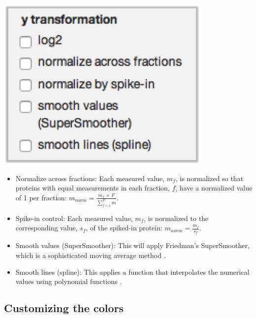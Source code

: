 \documentclass[letterpaper, twocolumn, 9pt]{article}
\begin{document}
\begin{center}
\includegraphics[scale = .5]{figures/ss_ytrafo.png}
\end{center}

\begin{itemize}\label{sec:norm}
\item \textsf{Normalize across fractions:} Each measured value, $m_f$, is normalized so that proteins with equal measurements in each fraction, $f$, have a normalized value of 1 per fraction: $m_{norm} = \frac{m_f\, \times \, F}{\sum\limits_{f=1}^{F} m}$.
\item \textsf{Spike-in control:} Each measured value, $m_f$, is normalized to the corresponding value, $s_f$, of the spiked-in protein: $m_{norm} = \frac{m_f}{s_f}$.
\item \textsf{Smooth values (SuperSmoother):} This will apply Friedman's SuperSmoother, which is a sophisticated moving average method \citep{Friedman1984}.
\item \textsf{Smooth lines (spline)}: This applies a function that interpolates the numerical values using polynomial functions \citep{Blanc1995}.
\end{itemize} 

\subsection{Customizing the colors}
\end{document}

